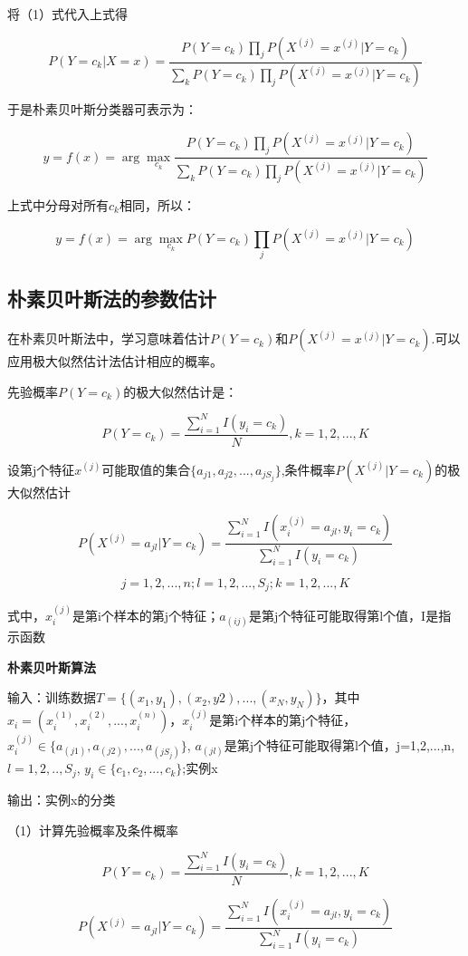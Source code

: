 \documentclass{ctexart}
\begin{document}
	将（1）式代入上式得
	
	\[P(Y=c_k|X=x)=\frac{P(Y=c_k)\prod_{j}P(X^{(j)}=x^{(j)}|Y=c_k)}{\sum_{k}P(Y=c_k)\prod_{j}P(X^{(j)}=x^{(j)}|Y=c_k)}\]
	
	于是朴素贝叶斯分类器可表示为：
	
	\[y=f(x)=\arg \max_{c_k}\frac{P(Y=c_k)\prod_{j}P(X^{(j)}=x^{(j)}|Y=c_k)}{\sum_{k}P(Y=c_k)\prod_{j}P(X^{(j)}=x^{(j)}|Y=c_k)}\]
	
	上式中分母对所有\(c_k\)相同，所以：
	
	\[y=f(x)=\arg \max_{c_k} P(Y=c_k)\prod_{j}P(X^{(j)}=x^{(j)}|Y=c_k)\]
	
	\subsection{朴素贝叶斯法的参数估计}
		
	在朴素贝叶斯法中，学习意味着估计\(P(Y=c_k)\)和\(P(X^{(j)}=x^{(j)}|Y=c_k)\).可以应用极大似然估计法估计相应的概率。
	
	先验概率\(P(Y=c_k)\)的极大似然估计是：
	
	\[P(Y=c_k)=\frac{\sum\limits_{i=1}^{N}I(y_i=c_k)}{N}, k=1,2,...,K\]
	
	设第j个特征\(x^{(j)}\)可能取值的集合\(\{a_{j1},a_{j2},...,a_{jS_j}\}\),条件概率\(P(X^{(j)}|Y=c_k)\)的极大似然估计
	
	\[P(X^{(j)}=a_{jl}|Y=c_k)=\frac{\sum\limits_{i=1}^{N}I(x_i^{(j)} = a_{jl},y_i=c_k)}{\sum\limits_{i=1}^{N}I(y_i=c_k)}\]
	
	\[j=1,2,...,n; l=1,2,...,S_j; k=1,2,...,K\]
	
	式中，\(x_i^{(j)}\)是第i个样本的第j个特征；\(a_{(ij)}\)是第j个特征可能取得第l个值，I是指示函数
	
	\textbf{朴素贝叶斯算法}

	输入：训练数据\(T = \{(x_1, y_1),(x_2, y2),...,(x_N, y_N)\}\)，其中\(x_i=(x_i^{(1)},x_i^{(2)},...,x_i^{(n)})\)，\(x_i^{(j)}\)是第i个样本的第j个特征，\(x_i^{(j)} \in \{a_{(j1)},a_{(j2)},...,a_{(jS_j)}\}\), \(a_{(jl)}\)是第j个特征可能取得第l个值，j=1,2,...,n, \(l=1,2,..,S_j\), \(y_i \in \{c_1, c_2,...,c_k\}\);实例x
	
	输出：实例x的分类
	
	（1）计算先验概率及条件概率
	
	\[P(Y=c_k)=\frac{\sum\limits_{i=1}^{N}I(y_i=c_k)}{N}, k=1,2,...,K\]
	
	\[P(X^{(j)}=a_{jl}|Y=c_k)=\frac{\sum\limits_{i=1}^{N}I(x_i^{(j)} = a_{jl}, y_i=c_k)}{\sum\limits_{i=1}^{N}I(y_i=c_k)}\]
\end{document}
